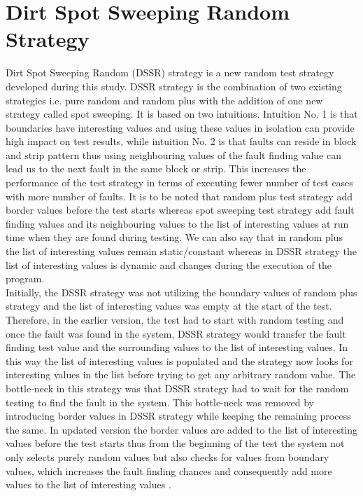 

\section{Dirt Spot Sweeping Random Strategy}

Dirt Spot Sweeping Random (DSSR) strategy is a new random test strategy developed during this study. DSSR strategy is the combination of two existing strategies i.e. pure random and random plus with the addition of one new strategy called spot sweeping. It is based on two intuitions. Intuition No. 1 is that boundaries have interesting values and using these values in isolation can provide high impact on test results, while intuition No. 2 is that faults can reside in block and strip pattern thus using neighbouring values of the fault finding value can lead us to the next fault in the same block or strip. This increases the performance of the test strategy in terms of executing fewer number of test cases with more number of faults. It is to be noted that random plus test strategy add border values before the test starts whereas spot sweeping test strategy add fault finding values and its neighbouring values to the list of interesting values at run time when they are found during testing. We can also say that in random plus the list of interesting values remain static/constant whereas in DSSR strategy the list of interesting values is dynamic and changes during the execution of the program.\\

Initially, the DSSR strategy was not utilizing the boundary values of random plus strategy and the list of interesting values was empty at the start of the test. Therefore, in the earlier version, the test had to start with random testing and once the fault was found in the system, DSSR strategy would transfer the fault finding test value and the surrounding values to the list of interesting values. In this way the list of interesting values is populated and the strategy now looks for interesting values in the list before trying to get any arbitrary random value. The bottle-neck in this strategy was that DSSR strategy had to wait for the random testing to find the fault in the system. This bottle-neck was removed by introducing border values in DSSR strategy while keeping the remaining process the same. In updated version the border values are added to the list of interesting values before the test starts thus from the beginning of the test the system not only selects purely random values but also checks for values from boundary values, which increases the fault finding chances and consequently add more values to the list of interesting values \cite{Kaner2004}.\\

